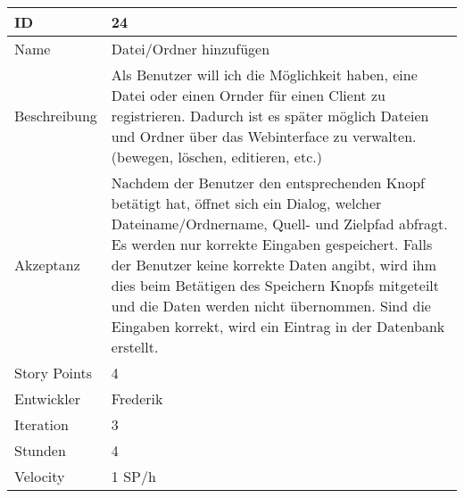 \begin{table}[htbp]
    \begin{minipage}{\linewidth}
        \setlength{\tymax}{0.5\linewidth}
        \centering
        \small
        \begin{tabulary}{\textwidth}{|l|p{10cm}|} \hline
            ID   &24\\\hline
	    Name  &Datei/Ordner hinzufügen\\\hline
	    Beschreibung&Als Benutzer will ich die Möglichkeit haben, eine Datei oder einen Ornder für einen Client zu registrieren. Dadurch ist es später möglich Dateien und Ordner über das Webinterface zu verwalten. (bewegen, löschen, editieren, etc.)\\\hline
	    Akzeptanz &Nachdem der Benutzer den entsprechenden Knopf betätigt hat, öffnet sich ein Dialog, welcher Dateiname/Ordnername, Quell- und Zielpfad abfragt. Es werden nur korrekte Eingaben gespeichert. Falls der Benutzer keine korrekte Daten angibt, wird ihm dies beim Betätigen des Speichern Knopfs mitgeteilt und die Daten werden nicht übernommen. Sind die Eingaben korrekt, wird ein Eintrag in der Datenbank erstellt.\\\hline
            Story Points&4\\\hline
            Entwickler &Frederik\\\hline
            Iteration &3\\\hline
            Stunden  &4\\\hline
            Velocity &1 SP\slash h\\\hline
        \end{tabulary}
    \end{minipage}
\end{table}



